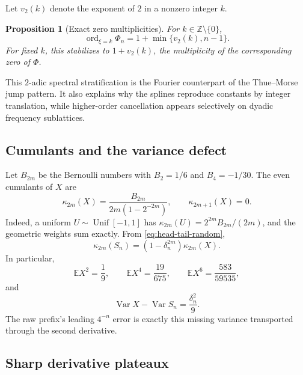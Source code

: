 \documentclass[11pt]{article}
\newtheorem{proposition}[theorem]{Proposition}
\theoremstyle{definition}
\theoremstyle{remark}
\newcommand{\E}{\mathbb E}
\newcommand{\Var}{\operatorname{Var}}
\begin{document}
Let $v_2(k)$ denote the exponent of $2$ in a nonzero integer $k$.

\begin{proposition}[Exact zero multiplicities]
\label{prop:zero-multiplicity}
For $k\in\mathbb Z\setminus\{0\}$,
\begin{equation}
 \operatorname{ord}_{\xi=k}\Phi_n
 =1+\min\{v_2(k),n-1\}.
 \label{eq:zero-multiplicity}
\end{equation}
For fixed $k$, this stabilizes to $1+v_2(k)$, the multiplicity of the corresponding
zero of $\Phi$.
\end{proposition}

This $2$-adic spectral stratification is the Fourier counterpart of the Thue--Morse
jump pattern.  It also explains why the splines reproduce constants by integer
translation, while higher-order cancellation appears selectively on dyadic frequency
sublattices.

\subsection{Cumulants and the variance defect}

Let $B_{2m}$ be the Bernoulli numbers with $B_2=1/6$ and $B_4=-1/30$.
The even cumulants of $X$ are
\begin{equation}
 \kappa_{2m}(X)=\frac{B_{2m}}{2m(1-2^{-2m})},
 \qquad \kappa_{2m+1}(X)=0.
 \label{eq:cumulants-X}
\end{equation}
Indeed, a uniform $U\sim\operatorname{Unif}[-1,1]$ has
$\kappa_{2m}(U)=2^{2m}B_{2m}/(2m)$, and the geometric weights sum exactly.
From \cref{eq:head-tail-random},
\begin{equation}
 \kappa_{2m}(S_n)=(1-\delta_n^{2m})\kappa_{2m}(X).
 \label{eq:cumulants-prefix}
\end{equation}
In particular,
\begin{equation}
 \E X^2=\frac19,
 \qquad
 \E X^4=\frac{19}{675},
 \qquad
 \E X^6=\frac{583}{59535},
 \label{eq:central-moments}
\end{equation}
and
\begin{equation}
 \Var X-\Var S_n=\frac{\delta_n^2}{9}.
 \label{eq:variance-defect}
\end{equation}
The raw prefix's leading $4^{-n}$ error is exactly this missing variance transported
through the second derivative.

\subsection{Sharp derivative plateaux}
\end{document}
